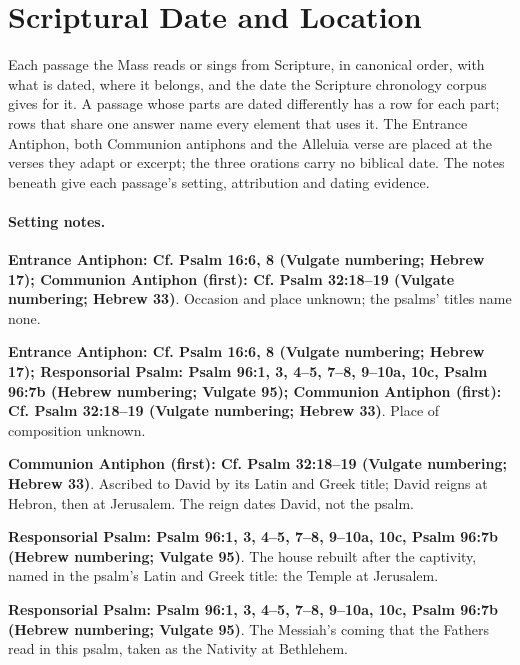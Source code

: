 \section{Scriptural Date and Location}
\label{sec:date-location}
{\small Each passage the Mass reads or sings from Scripture, in canonical order,
with what is dated, where it belongs, and the date the Scripture chronology
corpus gives for it. A passage whose parts are dated differently has a row for
each part; rows that share one answer name every element that uses it. The
Entrance Antiphon, both Communion antiphons and the Alleluia verse are placed at
the verses they adapt or excerpt; the three orations carry no biblical date.
The notes beneath give each passage's setting, attribution and dating
evidence.\par}
\medskip



\paragraph{Setting notes.}
\noindent\textbf{Entrance Antiphon: Cf. Psalm 16:6, 8 (Vulgate numbering; Hebrew 17); Communion Antiphon (first): Cf. Psalm 32:18--19 (Vulgate numbering; Hebrew 33)}. Occasion and place unknown; the psalms' titles name none.

\noindent\textbf{Entrance Antiphon: Cf. Psalm 16:6, 8 (Vulgate numbering; Hebrew 17); Responsorial Psalm: Psalm 96:1, 3, 4--5, 7--8, 9--10a, 10c, Psalm 96:7b (Hebrew numbering; Vulgate 95); Communion Antiphon (first): Cf. Psalm 32:18--19 (Vulgate numbering; Hebrew 33)}. Place of composition unknown.

\noindent\textbf{Communion Antiphon (first): Cf. Psalm 32:18--19 (Vulgate numbering; Hebrew 33)}. Ascribed to David by its Latin and Greek title; David reigns at Hebron, then at Jerusalem. The reign dates David, not the psalm.

\noindent\textbf{Responsorial Psalm: Psalm 96:1, 3, 4--5, 7--8, 9--10a, 10c, Psalm 96:7b (Hebrew numbering; Vulgate 95)}. The house rebuilt after the captivity, named in the psalm's Latin and Greek title: the Temple at Jerusalem.

\noindent\textbf{Responsorial Psalm: Psalm 96:1, 3, 4--5, 7--8, 9--10a, 10c, Psalm 96:7b (Hebrew numbering; Vulgate 95)}. The Messiah's coming that the Fathers read in this psalm, taken as the Nativity at Bethlehem.


